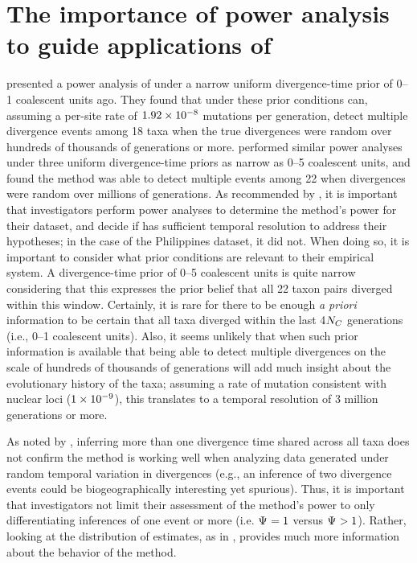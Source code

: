 \section*{The importance of power analysis to guide applications of \msb}
\citet{Hickerson2013} presented a power analysis of \msb under a narrow uniform
divergence-time prior of 0--1 coalescent units ago.
They found that under these prior conditions \msb can, assuming a
per-site rate of $1.92\times 10^{-8}$ mutations per generation, detect multiple
divergence events among 18 taxa when the true divergences were random over
hundreds of thousands of generations or more.
\citet{Oaks2012} performed similar power analyses under three uniform
divergence-time priors as narrow as 0--5 coalescent units, and found the
method was able to detect multiple events among 22 when divergences were random
over millions of generations.
As recommended by \citet{Oaks2012}, it is important that investigators perform
power analyses to determine the method's power for their dataset, and decide if
\msb has sufficient temporal resolution to address their hypotheses; in the
case of the Philippines dataset, it did not.
When doing so, it is important to consider what prior conditions are
relevant to their empirical system.
A divergence-time prior of 0--5 coalescent units is quite narrow considering
that this expresses the prior belief that all 22 taxon pairs diverged within
this window.
Certainly, it is  rare for there to be enough \emph{a priori} information to
be certain that all taxa diverged within the last 4$N_C$ generations
(i.e., 0--1 coalescent units).
Also, it seems unlikely that when such prior information is available that
being able to detect multiple divergences on the scale of hundreds of thousands
of generations will add much insight about the evolutionary history of the
taxa; assuming a rate of mutation consistent with nuclear loci ($1\times 10^{-9}$),
this translates to a temporal resolution of 3 million generations or more.

As noted by \citet{Oaks2012}, inferring more than one divergence time
shared across all taxa does not confirm the method is working well when
analyzing data generated under random temporal variation in divergences (e.g.,
an inference of two divergence events could be biogeographically interesting
yet spurious).
Thus, it is important that investigators not limit their assessment of the
method's power to only differentiating inferences of one event or more (i.e.
$\Psi_{} = 1$ versus $\Psi_{} > 1$).
Rather, looking at the distribution of estimates, as in \citet{Oaks2012},
provides much more information about the behavior of the method.



